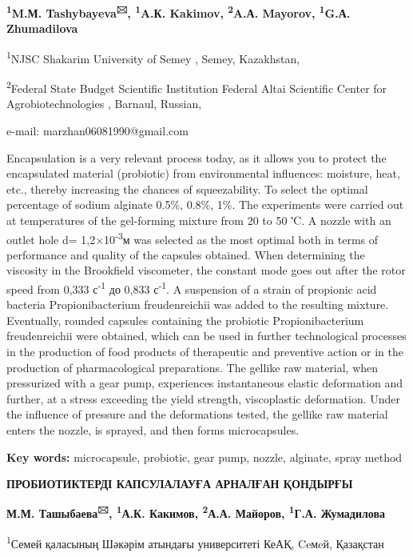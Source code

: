 {\bfseries \textsuperscript{1}M.М. Tashybayeva\textsuperscript{🖂},
\textsuperscript{1}A.К. Kakimov, \textsuperscript{2}A.А. Mayorov,
\textsuperscript{1}G.А. Zhumadilova}

\textsuperscript{1}NJSC Shakarim University of Semey , Semey,
Kazakhstan,

\textsuperscript{2}Federal State Budget Scientific Institution Federal
Altai Scientific Center for Agrobiotechnologies , Barnaul, Russian,

e-mail: marzhan06081990@gmail.com

Encapsulation is a very relevant process today, as it allows you to
protect the encapsulated material (probiotic) from environmental
influences: moisture, heat, etc., thereby increasing the chances of
squeezability. To select the optimal percentage of sodium alginate
0.5\%, 0.8\%, 1\%. The experiments were carried out at temperatures of
the gel-forming mixture from 20 to 50 ℃. A nozzle with an outlet hole d=
1,2×10\textsuperscript{-3}м was selected as the most optimal both in
terms of performance and quality of the capsules obtained. When
determining the viscosity in the Brookfield viscometer, the constant
mode goes out after the rotor speed from 0,333 с\textsuperscript{-1} до
0,833 с\textsuperscript{-1}. A suspension of a strain of propionic acid
bacteria Propionibacterium freudenreichii was added to the resulting
mixture. Eventually, rounded capsules containing the probiotic
Propionibacterium freudenreichii were obtained, which can be used in
further technological processes in the production of food products of
therapeutic and preventive action or in the production of
pharmacological preparations. The gellike raw material, when pressurized
with a gear pump, experiences instantaneous elastic deformation and
further, at a stress exceeding the yield strength, viscoplastic
deformation. Under the influence of pressure and the deformations
tested, the gellike raw material enters the nozzle, is sprayed, and then
forms microcapsules.

{\bfseries Key words:} microcapsule, probiotic, gear pump, nozzle,
alginate, spray method

{\bfseries ПРОБИОТИКТЕРДІ КАПСУЛАЛАУҒА АРНАЛҒАН ҚОНДЫРҒЫ}

{\bfseries М.М. Ташыбаева\textsuperscript{🖂}, \textsuperscript{1}А.К.
Какимов, \textsuperscript{2}А.А. Майоров, \textsuperscript{1}Г.А.
Жумадилова}

\textsuperscript{1}Семей қаласының Шәкәрім атындағы университеті КеАҚ,
Ceмeй, Қазақстан


